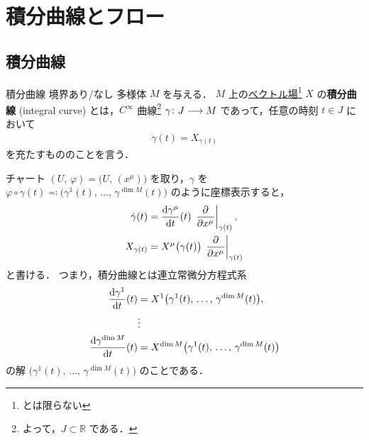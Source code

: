 \documentclass[geometry_main]{subfiles}
\begin{document}
\section{積分曲線とフロー}

\subsection{積分曲線}

\begin{mydef}[label=def:integral-curve]{積分曲線}
    境界あり/なし \cinfty 多様体 $M$ を与える． 
    $M$ 上の\hyperref[def:vecf]{ベクトル場}\footnote{\cinfty とは限らない} $X$ の\textbf{積分曲線} (integral curve) とは，$C^\infty$ 曲線\footnote{よって，$J \subset \mathbb{R}$ である．} $\gamma \colon J \longrightarrow M$ であって，任意の時刻 $t \in J$ において
    \begin{align}
        \dot{\gamma} (t) = X_{\gamma(t)}
    \end{align}
    を充たすもののことを言う．
\end{mydef}

チャート $(U,\, \varphi) = \bigl(U,\, (x^\mu)\bigr)$ を取り，$\gamma$ を $\varphi \circ \gamma (t) \eqqcolon \bigl( \gamma^1(t),\, \dots,\, \gamma^{\dim M} (t) \bigr)$ のように座標表示すると，
\begin{align}
    \dot{\gamma} (t) &= \dv{\gamma^\mu}{t}() (t)\, \eval{\pdv{}{x^\mu}}_{\gamma(t)}, \\
    X_{\gamma (t)} &= X^\mu \bigl( \gamma(t) \bigr) \, \eval{\pdv{}{x^\mu}}_{\gamma(t)}
\end{align}
と書ける．
つまり，積分曲線とは連立常微分方程式系
\begin{align}
    \dv{\gamma^1}{t}() (t) &= X^1 \bigl( \gamma^1(t),\, \dots,\, \gamma^{\dim M}(t) \bigr) , \\
    &\vdots \\
    \dv{\gamma^{\dim M}}{t}() (t) &= X^{\dim M} \bigl( \gamma^1(t),\, \dots,\, \gamma^{\dim M}(t) \bigr)
\end{align}
の解 $\bigl( \gamma^1(t),\, \dots,\, \gamma^{\dim M} (t) \bigr)$ のことである．
\end{document}
